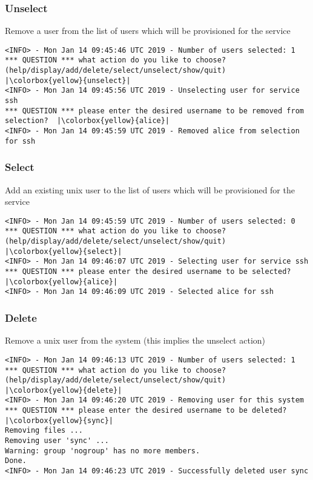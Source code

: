 \subsubsection{Unselect}
 Remove a user from the list of users which will be provisioned for the service
 \begin{lstlisting}[escapeinside=||]
<INFO> - Mon Jan 14 09:45:46 UTC 2019 - Number of users selected: 1
*** QUESTION *** what action do you like to choose? (help/display/add/delete/select/unselect/show/quit)  |\colorbox{yellow}{unselect}|
<INFO> - Mon Jan 14 09:45:56 UTC 2019 - Unselecting user for service ssh
*** QUESTION *** please enter the desired username to be removed from selection?  |\colorbox{yellow}{alice}|
<INFO> - Mon Jan 14 09:45:59 UTC 2019 - Removed alice from selection for ssh
 \end{lstlisting}
 
 \subsubsection{Select}
 Add an existing unix user to the list of users which will be provisioned for the service
 \begin{lstlisting}[escapeinside=||]
<INFO> - Mon Jan 14 09:45:59 UTC 2019 - Number of users selected: 0
*** QUESTION *** what action do you like to choose? (help/display/add/delete/select/unselect/show/quit)  |\colorbox{yellow}{select}|
<INFO> - Mon Jan 14 09:46:07 UTC 2019 - Selecting user for service ssh
*** QUESTION *** please enter the desired username to be selected?  |\colorbox{yellow}{alice}|
<INFO> - Mon Jan 14 09:46:09 UTC 2019 - Selected alice for ssh
 \end{lstlisting}
 
 \subsubsection{Delete}
 Remove a unix user from the system (this implies the unselect action)
 \begin{lstlisting}[escapeinside=||]
<INFO> - Mon Jan 14 09:46:13 UTC 2019 - Number of users selected: 1
*** QUESTION *** what action do you like to choose? (help/display/add/delete/select/unselect/show/quit)  |\colorbox{yellow}{delete}|
<INFO> - Mon Jan 14 09:46:20 UTC 2019 - Removing user for this system
*** QUESTION *** please enter the desired username to be deleted?  |\colorbox{yellow}{sync}|
Removing files ...
Removing user 'sync' ...
Warning: group 'nogroup' has no more members.
Done.
<INFO> - Mon Jan 14 09:46:23 UTC 2019 - Successfully deleted user sync
 \end{lstlisting}
 
